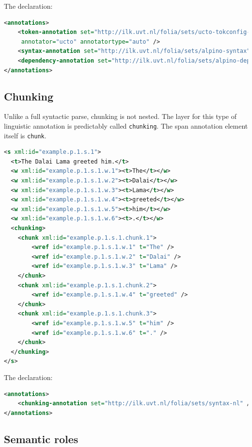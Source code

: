 \documentclass[a4paper,12pt]{report}
\begin{document}
The declaration:

\begin{lstlisting}[language=xml]
<annotations>
    <token-annotation set="http://ilk.uvt.nl/folia/sets/ucto-tokconfig-nl" 
     annotator="ucto" annotatortype="auto" />
    <syntax-annotation set="http://ilk.uvt.nl/folia/sets/alpino-syntax" /> 
    <dependency-annotation set="http://ilk.uvt.nl/folia/sets/alpino-dep" />
</annotations>
\end{lstlisting}

\subsection{Chunking}

Unlike a full syntactic parse, chunking is not nested. The layer for this type of linguistic annotation is predictably called \texttt{chunking}. The span annotation element itself is \texttt{chunk}.

\begin{lstlisting}[language=xml]
<s xml:id="example.p.1.s.1">
  <t>The Dalai Lama greeted him.</t>
  <w xml:id="example.p.1.s.1.w.1"><t>The</t></w>
  <w xml:id="example.p.1.s.1.w.2"><t>Dalai</t></w>
  <w xml:id="example.p.1.s.1.w.3"><t>Lama</t></w>
  <w xml:id="example.p.1.s.1.w.4"><t>greeted</t></w>
  <w xml:id="example.p.1.s.1.w.5"><t>him</t></w>
  <w xml:id="example.p.1.s.1.w.6"><t>.</t></w>
  <chunking>
    <chunk xml:id="example.p.1.s.1.chunk.1">       
        <wref id="example.p.1.s.1.w.1" t="The" />       
        <wref id="example.p.1.s.1.w.2" t="Dalai" />       
        <wref id="example.p.1.s.1.w.3" t="Lama" />        
    </chunk>
    <chunk xml:id="example.p.1.s.1.chunk.2">       
        <wref id="example.p.1.s.1.w.4" t="greeted" />
    </chunk>
    <chunk xml:id="example.p.1.s.1.chunk.3">       
        <wref id="example.p.1.s.1.w.5" t="him" />
        <wref id="example.p.1.s.1.w.6" t="." />
    </chunk>    
  </chunking>
</s>
\end{lstlisting}


The declaration:

\begin{lstlisting}[language=xml]
<annotations>
    <chunking-annotation set="http://ilk.uvt.nl/folia/sets/syntax-nl" />
</annotations>
\end{lstlisting}



\subsection{Semantic roles}
\end{document}
